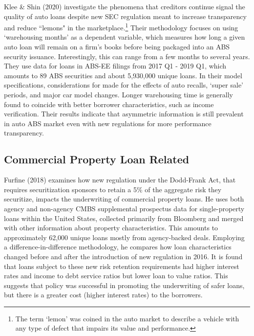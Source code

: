 \documentclass[10.5pt]{article}
\begin{document}

Klee \& Shin (2020) investigate the phenomena that creditors continue signal the quality of auto loans despite new SEC regulation meant to increase transparency and reduce ``lemons" in the marketplace.\footnote{The term `lemon' was coined in the auto market to describe a vehicle with any type of defect that impairs its value and performance.} Their methodology focuses on using `warehousing months' as a dependent variable, which measures how long a given auto loan will remain on a firm's books before being packaged into an ABS security issuance. Interestingly, this can range from a few months to several years. They use data for loans in ABS-EE filings from 2017 Q1 - 2019 Q1, which amounts to 89 ABS securities and about 5,930,000 unique loans. In their model specifications, considerations for made for the effects of auto recalls, `super sale' periods, and major car model changes. Longer warehousing time is generally found to coincide with better borrower characteristics, such as income verification. Their results indicate that asymmetric information is still prevalent in auto ABS market even with new regulations for more performance transparency.  

\subsection{Commercial Property Loan Related}
Furfine (2018) examines how new regulation under the Dodd-Frank Act, that requires securitization sponsors to retain a 5\% of the aggregate risk they securitize, impacts the underwriting of commercial property loans. He uses both agency and non-agency CMBS supplemental prospectus data for single-property loans within the United States, collected primarily from Bloomberg and merged with other information about property characteristics. This amounts to approximately 62,000 unique loans mostly from agency-backed deals. Employing a difference-in-difference methodology, he compares how loan characteristics changed before and after the introduction of new regulation in 2016. It is found that loans subject to these new risk retention requirements had higher interest rates and income to debt service ratios but lower loan to value ratios. This suggests that policy was successful in promoting the underwriting of safer loans, but there is a greater cost (higher interest rates) to the borrowers. 
\end{document}
